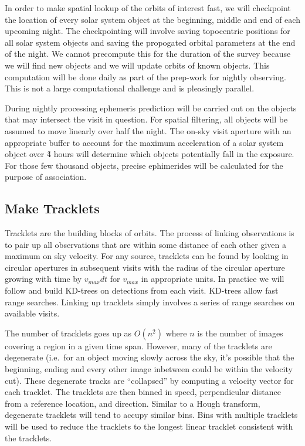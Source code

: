 In order to make spatial lookup of the orbits of interest fast, we will checkpoint the location of every solar system object at the beginning, middle and end of each upcoming night.  The checkpointing will involve saving topocentric positions for all solar system objects and saving the propogated orbital parameters at the end of the night.  We cannot precompute this for the duration of the survey because we will find new objects and we will update orbits of known objects.  This computation will be done daily as part of the prep-work for nightly observing.  This is not a large computational challenge and is pleasingly parallel.

During nightly processing ephemeris prediction will be carried out on the objects that may intersect the visit in question.  For spatial filtering, all objects will be assumed to move linearly over half the night.  The on-sky visit aperture with an appropriate buffer to account for the maximum acceleration of a solar system object over \~4 hours will determine which objects potentially fall in the exposure.  For those few thousand objects, precise ephimerides will be calculated for the purpose of association.

\subsection{Make Tracklets}
\label{sec:acMakeTracklets}
Tracklets are the building blocks of orbits.  The process of linking observations is to pair up all observations that are within some distance of each other given a maximum on sky velocity.  For any source, tracklets can be found by looking in circular apertures in subsequent visits with the radius of the circular aperture growing with time by $v_{max}dt$ for $v_{max}$ in appropriate units.  In practice we will follow \cite{kubica05} and build KD-trees on detections from each visit.  KD-trees allow fast range searches.  Linking up tracklets simply involves a series of range searches on available visits.

The number of tracklets goes up as $O(n^2)$ where $n$ is the number of images covering a region in a given time span.  However, many of the tracklets are degenerate (i.e.\ for an object moving slowly across the sky, it's possible that the beginning, ending and every other image inbetween could be within the velocity cut). These degenerate tracks are ``collapsed'' by computing a velocity vector for each tracklet.  The tracklets are then binned in speed, perpendicular distance from a reference location, and direction.  Similar to a Hough transform, degenerate tracklets will tend to accupy similar bins.  Bins with multiple tracklets will be used to reduce the tracklets to the longest linear tracklet consistent with the tracklets.

